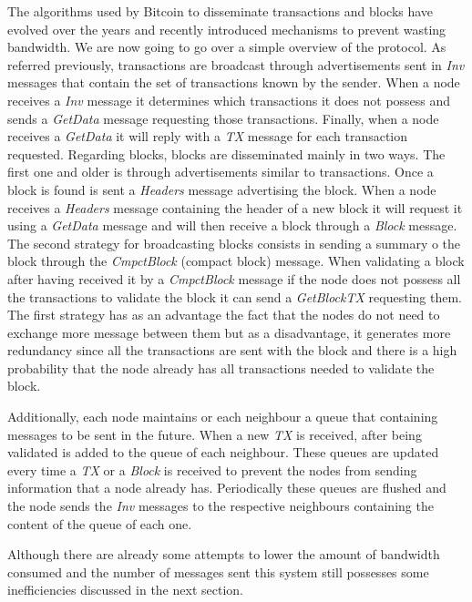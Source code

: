 \documentclass{dads}   %
\begin{document}
The algorithms used by Bitcoin to disseminate transactions and blocks have evolved over the years and recently introduced mechanisms to prevent wasting bandwidth. We are now going to go over a simple overview of the protocol. As referred previously, transactions are broadcast through advertisements sent in \textsl{Inv} messages that contain the set of transactions known by the sender. When a node receives a \textsl{Inv} message it determines which transactions it does not possess and sends a \textsl{GetData} message requesting those transactions. Finally, when a node receives a \textsl{GetData} it will reply with a \textsl{TX} message for each transaction requested. Regarding blocks, blocks are disseminated mainly in two ways. The first one and older is through advertisements similar to transactions. Once a block is found is sent a \textsl{Headers} message advertising the block. When a node receives a \textsl{Headers} message containing the header of a new block it will request it using a \textsl{GetData} message and will then receive a block through a \textsl{Block} message. The second strategy for broadcasting blocks consists in sending a summary o the block through the  \textsl{CmpctBlock} (compact block) message. When validating a block after having received it by a \textsl{CmpctBlock} message if the node does not possess all the transactions to validate the block it can send a \textsl{GetBlockTX} requesting them. The first strategy has as an advantage the fact that the nodes do not need to exchange more message between them but as a disadvantage, it generates more redundancy since all the transactions are sent with the block and there is a high probability that the node already has all transactions needed to validate the block.

Additionally, each node maintains or each neighbour a queue that containing messages to be sent in the future. When a new \textsl{TX} is received, after being validated is added to the queue of each neighbour. These queues are updated every time a \textsl{TX} or a \textsl{Block} is received to prevent the nodes from sending information that a node already has. Periodically these queues are flushed and the node sends the \textsl{Inv} messages to the respective neighbours containing the content of the queue of each one.

Although there are already some attempts to lower the amount of bandwidth consumed and the number of messages sent this system still possesses some inefficiencies discussed in the next section.
\end{document}
